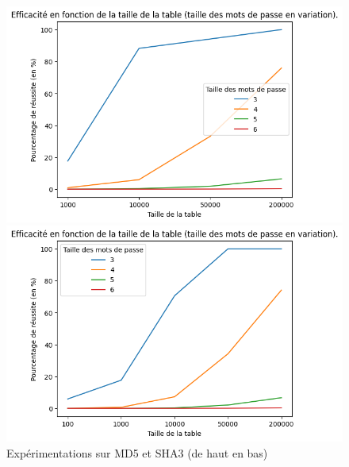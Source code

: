 \documentclass[french,12pt]{article}
\begin{document}
     \begin{figure}[H]
     \centering
    
      \includegraphics[scale=0.9]{img/graphe/md5/T_S_C_100000_MotGenerator.png}
    
    
      \includegraphics[scale=0.9]{img/graphe/sha3/T_S_C_100000_MotGenerator.png}
    
   
    \caption{Expérimentations sur MD5 et SHA3 (de haut en bas)}
    \label{fig:TSC}
    \end{figure}
    
\end{document}
